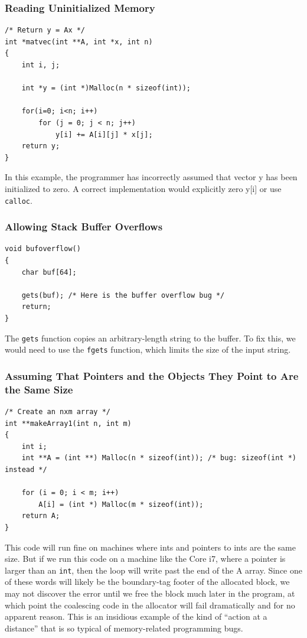 \documentclass[11pt]{article}
\begin{document}
\subsubsection{Reading Uninitialized Memory}
\label{sec:org0ad9e10}
\begin{verbatim}
/* Return y = Ax */
int *matvec(int **A, int *x, int n)
{
    int i, j;

    int *y = (int *)Malloc(n * sizeof(int));

    for(i=0; i<n; i++)
        for (j = 0; j < n; j++)
            y[i] += A[i][j] * x[j];
    return y;
}
\end{verbatim}
In this example, the programmer has incorrectly assumed that vector y has been initialized to zero. A correct implementation would explicitly zero y[i] or use \texttt{calloc}.\\

\subsubsection{Allowing Stack Buffer Overflows}
\label{sec:org2f19d5d}
\begin{verbatim}
void bufoverflow()
{
    char buf[64];

    gets(buf); /* Here is the buffer overflow bug */
    return;
}
\end{verbatim}
The \texttt{gets} function copies an arbitrary-length string to the buffer. To fix this, we would need to use the \texttt{fgets} function, which limits the size of the input string.\\

\subsubsection{Assuming That Pointers and the Objects They Point to Are the Same Size}
\label{sec:org12002e0}

\begin{verbatim}
/* Create an nxm array */
int **makeArray1(int n, int m)
{
    int i;
    int **A = (int **) Malloc(n * sizeof(int)); /* bug: sizeof(int *) instead */

    for (i = 0; i < m; i++)
        A[i] = (int *) Malloc(m * sizeof(int));
    return A;
}
\end{verbatim}

This code will run fine on machines where ints and pointers to ints are the same size. But if we run this code on a machine like the Core i7, where a pointer is larger than an \texttt{int}, then the loop will write past the end of the A array. Since one of these words will likely be the boundary-tag footer of the allocated block, we may not discover the error until we free the block much later in the program, at which point the coalescing code in the allocator will fail dramatically and for no apparent reason. This is an insidious example of the kind of “action at a distance” that is so typical of memory-related programming bugs.\\
\end{document}
